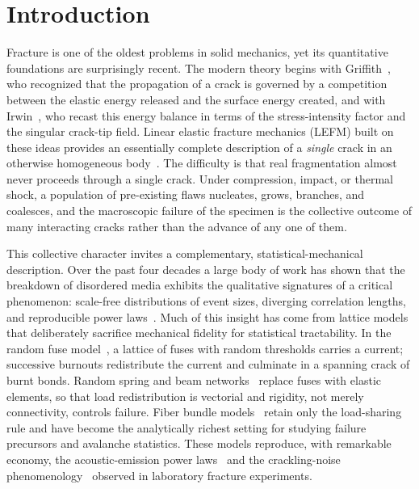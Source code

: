 \documentclass[preprint,12pt]{elsarticle}
\begin{document}
\section{Introduction}
\label{sec:intro}

Fracture is one of the oldest problems in solid mechanics, yet its quantitative
foundations are surprisingly recent. The modern theory begins with
Griffith~\cite{Griffith1921}, who recognized that the propagation of a crack is
governed by a competition between the elastic energy released and the surface energy
created, and with Irwin~\cite{Irwin1957}, who recast this energy balance in terms of
the stress-intensity factor and the singular crack-tip field. Linear elastic
fracture mechanics (LEFM) built on these ideas provides an essentially complete
description of a \emph{single} crack in an otherwise homogeneous
body~\cite{Anderson2005,Lawn1993}. The difficulty is that real fragmentation almost
never proceeds through a single crack. Under compression, impact, or thermal shock,
a population of pre-existing flaws nucleates, grows, branches, and coalesces, and the
macroscopic failure of the specimen is the collective outcome of many interacting
cracks rather than the advance of any one of them.

This collective character invites a complementary, statistical-mechanical
description. Over the past four decades a large body of work has shown that the
breakdown of disordered media exhibits the qualitative signatures of a critical
phenomenon: scale-free distributions of event sizes, diverging correlation lengths,
and reproducible power laws~\cite{HerrmannRoux1990,AlavaNukalaZapperi2006,SethnaDahmenMyers2001,BonamyBouchaud2011}.
Much of this insight has come from lattice models that deliberately sacrifice
mechanical fidelity for statistical tractability. In the random fuse
model~\cite{deArcangelis1985}, a lattice of fuses with random thresholds carries a
current; successive burnouts redistribute the current and culminate in a spanning
crack of burnt bonds. Random spring and beam
networks~\cite{HerrmannHansenRoux1989,CurtinScher1990} replace fuses with elastic
elements, so that load redistribution is vectorial and rigidity, not merely
connectivity, controls failure. Fiber bundle
models~\cite{PradhanHansenChakrabarti2010} retain only the load-sharing rule and have
become the analytically richest setting for studying failure precursors and
avalanche statistics. These models reproduce, with remarkable economy, the
acoustic-emission power laws~\cite{GarcimartinGuarinoBellonCiliberto1997} and the
crackling-noise phenomenology~\cite{SethnaDahmenMyers2001} observed in laboratory
fracture experiments.
\end{document}
